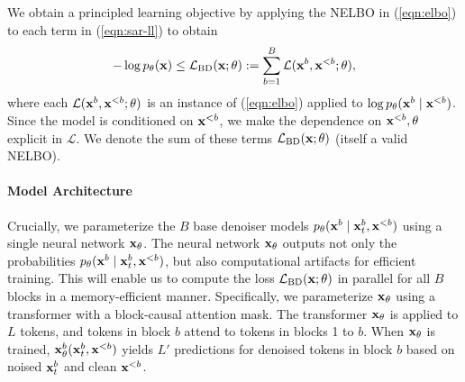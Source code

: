 \documentclass{article} %
\newcommand{\marianne}[1]{\textcolor{brown}{[Marianne: #1]}}
\begin{document}
We obtain a principled learning objective by applying the NELBO in (\ref{eqn:elbo}) to each term in (\ref{eqn:sar-ll}) to obtain
\begin{align}\label{eqn:sar-elbo}
    - \log p_\theta({\mathbf x}) \leq \mathcal{L}_\text{BD}({\mathbf x}; \theta) := \sum_{b=1}^{B} \mathcal{L}({\mathbf x}^b, {\mathbf x}^{<b}; \theta),
\end{align}
where each $\mathcal{L}({\mathbf x}^b, {\mathbf x}^{<b}; \theta)$ is an instance of (\ref{eqn:elbo}) applied to $\log p_\theta({\mathbf x}^{b} \mid {\mathbf x}^{<b})$. Since the model is conditioned on ${\mathbf x}^{<b}$, we make the dependence on ${\mathbf x}^{<b}, \theta$ explicit in $\mathcal{L}$.
We denote the sum of these terms  $\mathcal{L}_\text{BD}({\mathbf x}; \theta)$ (itself a valid NELBO).


\paragraph{Model Architecture}
Crucially, we parameterize the $B$ base denoiser models $p_\theta({\mathbf x}^b \mid {\mathbf x}^b_t, {\mathbf x}^{<b})$ using a single neural network ${\mathbf x}_\theta$. The neural network ${\mathbf x}_\theta$ outputs not only the probabilities $p_\theta({\mathbf x}^b \mid {\mathbf x}_t^b, {\mathbf x}^{<b})$, but also computational artifacts for efficient training. This will enable us to compute the loss $\mathcal{L}_\text{BD}({\mathbf x}; \theta)$ in parallel for all $B$ blocks in a memory-efficient manner.
Specifically, we parameterize ${\mathbf x}_\theta$ using a transformer \citep{vaswani2017attention} with a block-causal attention mask. The transformer ${\mathbf x}_\theta$ is applied to $L$ tokens, and tokens in block $b$ attend to tokens in blocks 1 to $b$. When ${\mathbf x}_\theta$ is trained, ${\mathbf x}^b_\theta({\mathbf x}^b_t, {\mathbf x}^{<b})$ yields $L'$ predictions for denoised tokens in block $b$ based on noised ${\mathbf x}^b_t$ and clean ${\mathbf x}^{<b}$. %
\end{document}

